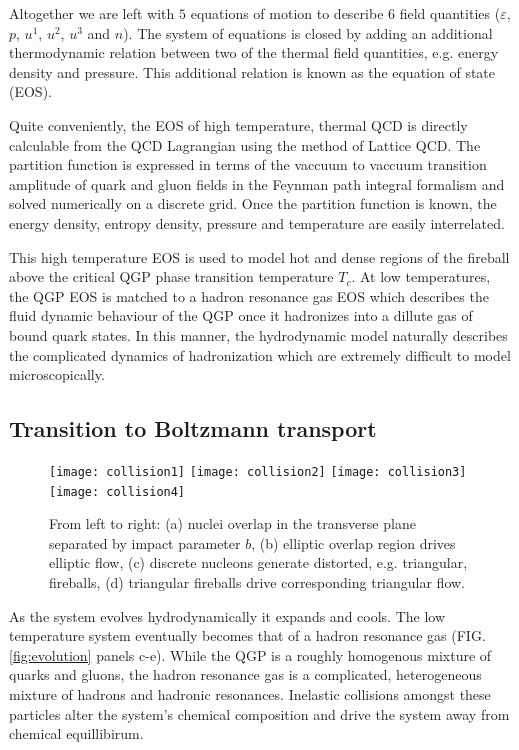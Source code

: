 \documentclass[aps,prc,reprint,amsmath,nofootinbib]{revtex4-1}
\begin{document}
Altogether we are left with $5$ equations of motion to describe $6$ field quantities ($\varepsilon$, $p$, $u^1$, $u^2$, $u^3$ and $n$).
The system of equations is closed by adding an additional thermodynamic relation between two of the thermal field quantities, e.g. energy density and pressure. 
This additional relation is known as the equation of state (EOS).

Quite conveniently, the EOS of high temperature, thermal QCD is directly calculable from the QCD Lagrangian using the method of Lattice QCD. The partition function
is expressed in terms of the vaccuum to vaccuum transition amplitude of quark and gluon fields in the Feynman path integral formalism and solved numerically on a
discrete grid. Once the partition function is known, the energy density, entropy density, pressure and temperature are easily interrelated. 

This high temperature EOS is used to model hot and dense regions of the fireball above the critical QGP phase transition temperature $T_c$. At low temperatures,
the QGP EOS is matched to a hadron resonance gas EOS which describes the fluid dynamic behaviour of the QGP once it hadronizes into a dillute gas of bound quark
states. In this manner, the hydrodynamic model naturally describes the complicated dynamics of hadronization which are extremely difficult to model microscopically.

\subsection{Transition to Boltzmann transport}

\begin{figure}
 \texttt{[image: collision1]}
 \texttt{[image: collision2]}
 \texttt{[image: collision3]}
 \texttt{[image: collision4]}
 \caption{\label{fig:spacetime} From left to right: (a) nuclei overlap in the transverse plane separated by impact parameter $b$, (b) elliptic overlap
 region drives elliptic flow, (c) discrete nucleons generate distorted, e.g. triangular, fireballs, (d) triangular fireballs drive corresponding triangular flow.}
\end{figure}

As the system evolves hydrodynamically it expands and cools. The low temperature system eventually becomes that of a hadron resonance gas (FIG. \ref{fig:evolution} panels c-e). While the QGP is a 
roughly homogenous mixture of quarks and gluons, the hadron resonance gas is a complicated, heterogeneous mixture of hadrons and hadronic resonances. Inelastic collisions 
amongst these particles alter the system's chemical composition and drive the system away from chemical equillibirum. 
\end{document}
